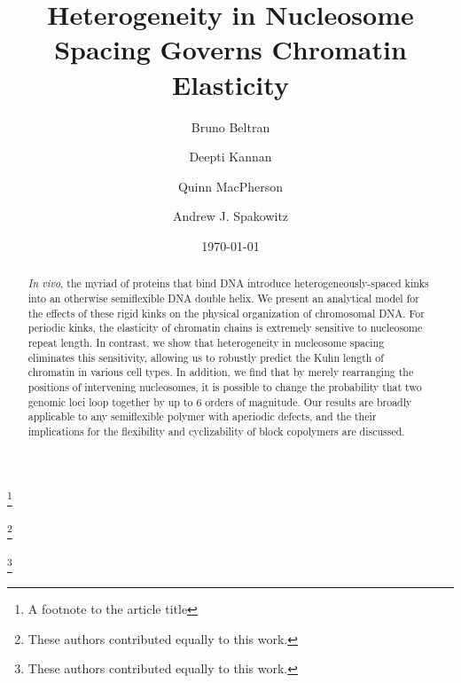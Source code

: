 \documentclass[%
 reprint,
superscriptaddress,
showpacs,preprintnumbers,
 amsmath,amssymb,
 aps,
 prl,
]{revtex4-1}
\begin{document}
\title{Heterogeneity in Nucleosome Spacing Governs Chromatin Elasticity}%
\thanks{A footnote to the article title}%

\author{Bruno Beltran}
\thanks{These authors contributed equally to this work.}%
%
\author{Deepti Kannan}%
\thanks{These authors contributed equally to this work.}%
\author{Quinn MacPherson}%
%
\author{Andrew J. Spakowitz}%
%
%
%
%
\date{\today}%

\begin{abstract}
\textit{In vivo}, the myriad of proteins that bind DNA introduce heterogeneously-spaced
    kinks into an otherwise semiflexible DNA double helix.
We present an analytical model for the effects of these rigid kinks on the
    physical organization of chromosomal DNA\@.
For periodic kinks, the elasticity of chromatin chains is extremely sensitive to
    nucleosome repeat length.
In contrast, we show that heterogeneity in nucleosome spacing eliminates this
    sensitivity, allowing us to robustly predict the Kuhn length of chromatin in
    various cell types.
In addition, we find that by merely rearranging the positions of intervening
    nucleosomes, it is possible to change the probability that two genomic
    loci loop together by up to 6 orders of magnitude.
Our results are broadly applicable to any semiflexible polymer with aperiodic
    defects, and the their implications for the flexibility and cyclizability of
    block copolymers are discussed.
\end{abstract}
\end{document}
